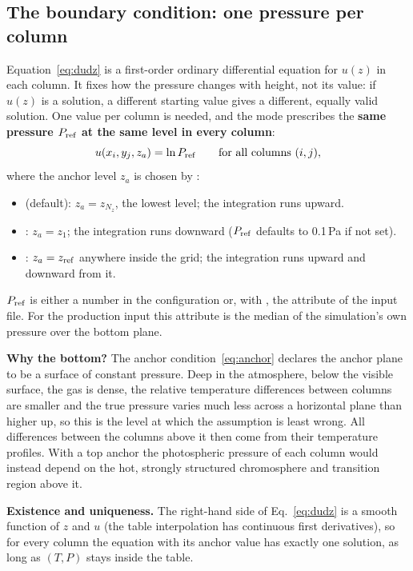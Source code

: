 \subsection{The boundary condition: one pressure per column}\label{sec:anchor}
Equation~\eqref{eq:dudz} is a first-order ordinary differential equation for $u(z)$ in each column. It fixes how the
pressure changes with height, not its value: if $u(z)$ is a solution, a different starting value gives a different, equally
valid solution. One value per column is needed, and the mode prescribes the \textbf{same pressure $P_{\rm ref}$ at the
same level in every column}:
\begin{equation}
u(x_i,y_j,z_a)=\ln P_{\rm ref}\qquad\text{for all columns }(i,j),\label{eq:anchor}
\end{equation}
where the anchor level $z_a$ is chosen by :
\begin{itemize}
\item {} (default): $z_a=z_{N_z}$, the lowest level; the integration runs upward.
\item {}: $z_a=z_1$; the integration runs downward ($P_{\rm ref}$ defaults to 0.1\,Pa if not set).
\item {}: $z_a=z_{\rm ref}$ anywhere inside the grid; the integration runs upward and downward from it.
\end{itemize}
$P_{\rm ref}$ is either a number in the configuration or, with , the attribute
 of the input file. For the production input this attribute is the median of the simulation's own
pressure over the bottom plane.

\textbf{Why the bottom?} The anchor condition~\eqref{eq:anchor} declares the anchor plane to be a surface of constant
pressure. Deep in the atmosphere, below the visible surface, the gas is dense, the relative temperature differences
between columns are smaller and the true pressure varies much less across a horizontal plane than higher up, so this is
the level at which the assumption is least wrong. All differences between the columns above it then come from their
temperature profiles. With a top anchor the photospheric pressure of each column would instead depend on the hot,
strongly structured chromosphere and transition region above it.

\textbf{Existence and uniqueness.} The right-hand side of Eq.~\eqref{eq:dudz} is a smooth function of $z$ and $u$ (the
table interpolation has continuous first derivatives), so for every column the equation with its anchor value has
exactly one solution, as long as $(T,P)$ stays inside the table.

